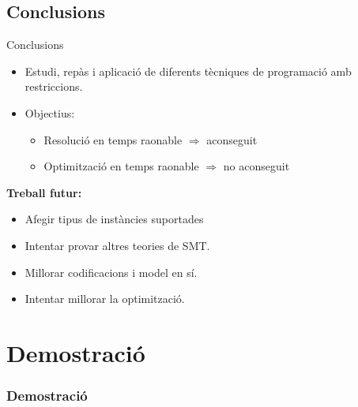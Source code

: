 \documentclass[13pt]{beamer}
\begin{document}
  \subsection{Conclusions}

  
  \begin{frame}{Conclusions}
    \begin{itemize}
      \item Estudi, repàs i aplicació de diferents tècniques de programació amb restriccions.
      \item Objectius:
      \begin{itemize}
        \item Resolució en temps raonable $\Rightarrow$ aconseguit
        \item Optimització en temps raonable  $\Rightarrow$ no aconseguit
      \end{itemize}
    \end{itemize}
    \textbf{Treball futur:}\\
    \begin{itemize}
      \item Afegir tipus de instàncies suportades
      \item Intentar provar altres teories de SMT.
      \item Millorar codificacions i model en sí.
      \item Intentar millorar la optimització.
    \end{itemize}


  \end{frame}


  \section{Demostració}
  \begin{frame}
    \frametitle{Demostració}
  \end{frame}




  
\end{document}
